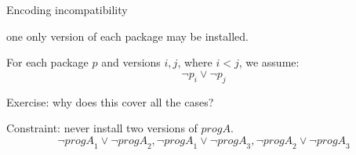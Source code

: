 \documentclass[xetex,aspectratio=169,14pt,hyperref={pdfpagelabels=true,pdflang={en-GB}}]{beamer}
\begin{document}
\begin{frame}
  {Encoding incompatibility}

   one only version of each package may be installed.

  \pause
  \medskip
  For each package $p$ and versions $i, j$, where $i < j$, we assume:
  \begin{displaymath}
    \lnot \mathit{p}_i \lor \lnot \mathit{p}_j
  \end{displaymath}

  \textcolor{black!60}{Exercise: why does this cover all the cases?}

  \pause
  \medskip
  Constraint: never install two versions of $\mathit{progA}$.
  \begin{displaymath}
    \lnot \mathit{progA}_1 \lor \lnot \mathit{progA}_2,
    \lnot \mathit{progA}_1 \lor \lnot \mathit{progA}_3,
    \lnot \mathit{progA}_2 \lor \lnot \mathit{progA}_3
  \end{displaymath}

\end{frame}
\end{document}
